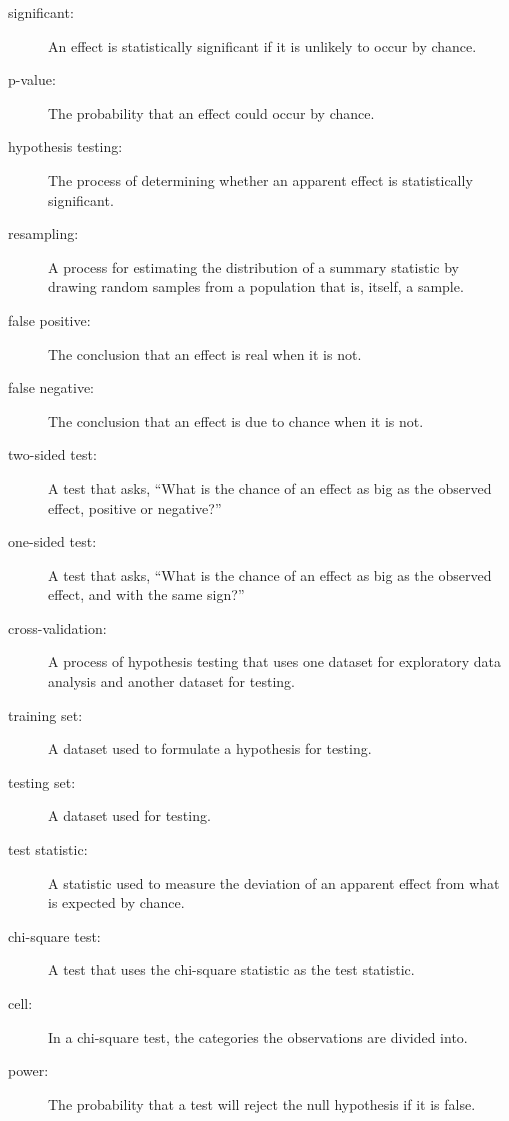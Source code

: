 \documentclass[12pt]{book}
\begin{document}
\begin{description}

\item[significant:] An effect is statistically significant if it is unlikely
to occur by chance.

\item[p-value:] The probability that an effect could occur by chance.

\item[hypothesis testing:] The process of determining whether an apparent
effect is statistically significant.

\item[resampling:] A process for estimating the distribution of a summary
statistic by drawing random samples from a population that is, itself, a
sample.

\item[false positive:] The conclusion that an effect is real when it is not.

\item[false negative:] The conclusion that an effect is due to chance when it
is not.

\item[two-sided test:] A test that asks, ``What is the chance of an effect
as big as the observed effect, positive or negative?''

\item[one-sided test:] A test that asks, ``What is the chance of an effect
as big as the observed effect, and with the same sign?''

\item[cross-validation:] A process of hypothesis testing that uses one
dataset for exploratory data analysis and another dataset for testing.

\item[training set:] A dataset used to formulate a hypothesis for testing.

\item[testing set:] A dataset used for testing.

\item[test statistic:] A statistic used to measure the deviation of an
apparent effect from what is expected by chance.

\item[chi-square test:] A test that uses the chi-square statistic as
the test statistic.

\item[cell:] In a chi-square test, the categories the observations are
divided into.

\item[power:] The probability that a test will reject the null hypothesis
if it is false.

\end{description}
\end{document}

